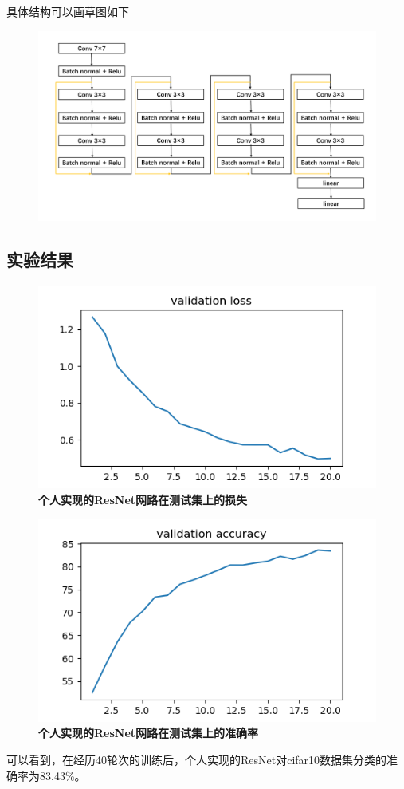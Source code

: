 \documentclass{article}
\begin{document}
具体结构可以画草图如下
\begin{figure}[H]
   \centering
   \includegraphics[scale= 0.3]{展示}

\end{figure}
\subsection{实验结果}
\begin{figure}[H]
   \centering
   \includegraphics{Resnet_validation_loss.png}
   \caption{\textbf{个人实现的ResNet网路在测试集上的损失}}
\end{figure}
\begin{figure}[H]
   \centering
   \includegraphics{Resnet_validation_accuracy.png}
   \caption{\textbf{个人实现的ResNet网路在测试集上的准确率}}
\end{figure}
可以看到，在经历40轮次的训练后，个人实现的ResNet对cifar10数据集分类的准确率为83.43\%。
\end{document}
